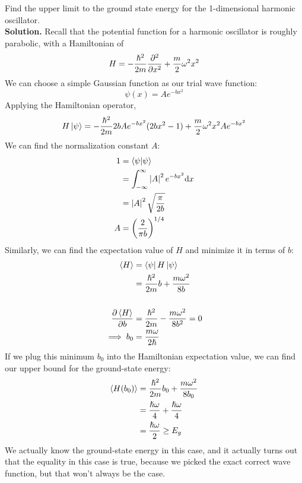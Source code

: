 \documentclass[a4paper]{article}
\begin{document}
\begin{eg}
	Find the upper limit to the ground state energy for the 1-dimensional
	harmonic oscillator.\\
	\textbf{Solution.}
	Recall that the
	potential function for a harmonic oscillator is roughly parabolic,
	with a Hamiltonian of
	\[ H = -\frac{\hbar^2}{2m}\frac{\partial ^2}{\partial x^2} + \frac{m}{2}\omega^2 x^2 \]
	We can choose a simple Gaussian function as our trial wave function:
	\[ \psi(x) = Ae^{-bx^2} \]
	Applying the Hamiltonian operator,
	\[ H\left\lvert \psi\right\rangle = -\frac{\hbar^2}{2m}2bAe^{-bx^2}(2bx^2-1) +
		\frac{m}{2}\omega^2 x^2 Ae^{-bx^2} \]
	We can find the normalization constant $A$:
	\begin{align*}
		1 &= \left\langle \psi\middle\vert \psi \right\rangle\\
		  &= \int_{-\infty}^\infty \left\lvert A\right\rvert^2e^{-bx^2}\mathrm{d} x\\
		  &= \left\lvert A\right\rvert^2\sqrt{\frac{\pi}{2b}}\\
		A &= \left(\frac{2}{\pi b}\right)^{1/4}
	\end{align*}
	Similarly, we can find the expectation value of $H$ and minimize it
	in terms of $b$:
	\begin{align*}
		\left\langle H\right\rangle &= \left\langle \psi \right\rvert H\left\lvert \psi\right\rangle\\
			  &=\frac{\hslash^2}{2m}b+\frac{m\omega^2}{8b}
		\\~\\
		\frac{\partial \left\langle H\right\rangle}{\partial b} &=
		\frac{\hslash^2}{2m} - \frac{m\omega^2}{8b^2} = 0\\
		\implies b_0 &= \frac{m\omega}{2\hslash}
	\end{align*}
	If we plug this minimum $b_0$ into the Hamiltonian expectation value,
	we can find our upper bound for the ground-state energy:
	\begin{align*}
		\left\langle H(b_0)\right\rangle &=
			\frac{\hslash^2}{2m}b_0 + \frac{m\omega^2}{8b_0}\\
			&= \frac{\hslash\omega}{4} + \frac{\hslash\omega}{4}\\
			&= \frac{\hslash\omega}{2} \geq E_g
	\end{align*}
	We actually know the ground-state energy in this case, and it
	actually turns out that the equality in this case is true, because
	we picked the exact correct wave function, but that won't always be the
	case.
\end{eg}
\end{document}
